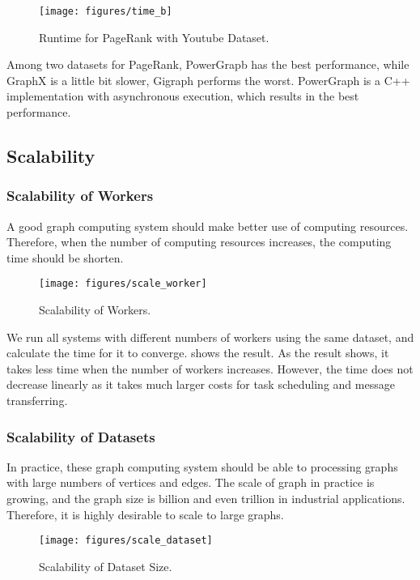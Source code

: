\begin{figure}[t]
  \texttt{[image: figures/time\_b]}
  \caption{Runtime for PageRank with Youtube Dataset.}
  \label{fig:time:b}
\end{figure}

Among two datasets for PageRank, PowerGrapb has the best performance,
while GraphX is a little bit slower, Gigraph performs the worst.
PowerGraph is a C++ implementation with asynchronous execution, which
results in the best performance.

\subsection{Scalability} \label{subsec:scalability}
\subsubsection{Scalability of Workers}
A good graph computing system should make better use of computing
resources. Therefore, when the number of computing resources increases,
the computing time should be shorten.

\begin{figure}[t]
  \texttt{[image: figures/scale\_worker]}
  \caption{Scalability of Workers.}
  \label{fig:scale:worker}
\end{figure}

We run all systems with different numbers of workers using the same dataset,
and calculate the time for it to converge. 
shows the result. As the result shows, it takes less time
when the number of workers increases. However, the time
does not decrease linearly as it takes much larger costs
for task scheduling and message transferring.

\subsubsection{Scalability of Datasets}
In practice, these graph computing system should be able to processing
graphs with large numbers of vertices and edges. The scale of graph
in practice is growing, and the graph size is billion and even trillion
in industrial applications. Therefore, it is highly desirable to
scale to large graphs.

\begin{figure}[t]
  \texttt{[image: figures/scale\_dataset]}
  \caption{Scalability of Dataset Size.}
  \label{fig:scale:dataset}
\end{figure}

